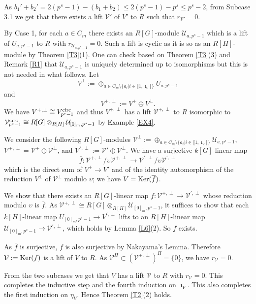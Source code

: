 \documentclass[11pt]{amsart}
\def\circul{\textup{circ}}
\def\Ker{\textup{Ker}}
\begin{document}
As $b_1'+b_2'=2(p^s-1)-(b_1+b_2)\le 2(p^s-1)-p^s\le p^s-2$, from Subcase 3.1 we get that there exists a lift $\mathcal V'$ of $V'$ to $R$ such that $r_{\mathcal V'}=0$. 

By Case 1, for each $a\in C_m$ there exists an $R[G]$-module $\mathcal U_{a,p^s-1}$ which is a lift of $U_{a,p^s-1}$ to $R$ with $r_{\mathcal U_{a,p^s-1}}=0$. Such a lift is cyclic as it is so as an $R[H]$-module by Theorem \ref{T3}(1). One can check based on Theorem \ref{T3}(3) and Remark \ref{R1} that $\mathcal U_{a,p^s-1}$ is uniquely determined up to isomorphisms but this is not needed in what follows. Let 
$$V^{\perp}:=\oplus_{a\in C_m\setminus\{a_i|i\in\llbracket1,\imath_V\rrbracket\}} U_{a,p^s-1}$$ 
and 
$$V^{+,\perp}:=V^+\oplus V^{\perp}.$$ We have $V^{+,\perp}\cong V_{p^s-1}^{\circul}$ and thus $V^{+,\perp}$ has a lift $\mathcal V^{+,\perp}$ to $R$ isomorphic to $\mathcal V_{p^s-1}^{\circul}\cong R[G]\otimes_{R[H]} \mathcal U_{[0]_m,p^s-1}$ by Example \ref{EX4}. 

We consider the following $R[G]$-modules $\mathcal V^{\perp}:=\oplus_{a\in C_m\setminus\{a_i|i\in\llbracket1,\imath_V\rrbracket\}} \mathcal U_{a,p^s-1}$, $\mathcal V^{+,\perp}=\mathcal V^+\oplus \mathcal V^{\perp}$, and $\mathcal V^{',\perp}:=\mathcal V'\oplus\mathcal V^{\perp}$. We have a surjective $k[G]$-linear map 
$$\overline{f}:\mathcal V^{+,\perp}/\upsilon\mathcal V^{+,\perp}\rightarrow \mathcal V^{',\perp}/\upsilon\mathcal V^{',\perp}$$ 
which is the direct sum of $V^+\rightarrow V'$ and of the identity automorphism of the reduction $V^{\perp}$ of $\mathcal V^{\perp}$ modulo $\upsilon$; we have $V=\Ker(\overline{f})$. 

We show that there exists an $R[G]$-linear map $f:\mathcal V^{+,\perp}\rightarrow \mathcal V^{',\perp}$ whose reduction modulo $\upsilon$ is $\overline{f}$. As $\mathcal V^{+,\perp}\cong R[G]\otimes_{R[H]} \mathcal U_{[0]_m,p^s-1}$, it suffices to show that each $k[H]$-linear map $U_{[0]_m,p^s-1}\rightarrow V^{',\perp}$ lifts to an $R[H]$-linear map $\mathcal U_{[0]_m,p^s-1}\rightarrow\mathcal V^{',\perp}$, which holds by Lemma \ref{L6}(2). So $f$ exists. 

As $\overline{f}$ is surjective, $f$ is also surjective by Nakayama's Lemma. Therefore $\mathcal V:=\Ker(f)$ is a lift of $V$ to $R$. As $\mathcal V^H\subset (\mathcal V^{+,\perp})^H=\{0\}$, we have $r_{\mathcal V}=0$.

From the two subcases we get that $V$ has a lift $\mathcal V$ to $R$ with $r_{\mathcal V}=0$. This completes the inductive step and the fourth  induction on $\imath_V$. This also completes the first induction on $\eta_V$. Hence Theorem \ref{T2}(2) holds.
\end{document}
